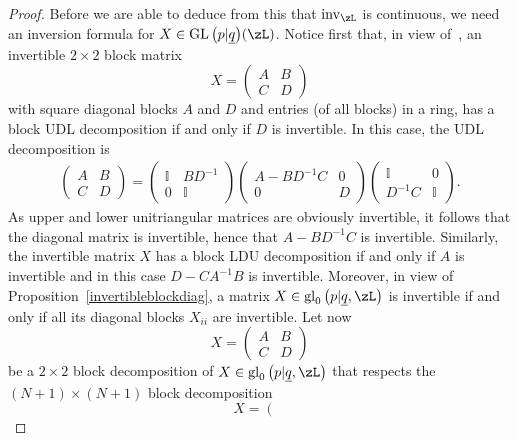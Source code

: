 \documentclass[pdftex]{sigma}%
\newcommand{\op}[1]{\operatorname{#1}}
\def\ul{\underline}
\def\ul{\underline}
\newcommand{\0}{\otimes}
\numberwithin{equation}{section}
\begin{document}
\begin{proof}
Before we are able to deduce from this that $\op{inv}_\zL$ is continuous, we need an inversion formula for $X\in\op{GL}\big(p|\ul q\big)(\zL)$. Notice first that, in view of~\cite[Proposition 4.7]{Covolo:2012}, an invertible $2\times 2$ block matrix
\begin{equation*}
X =\begin{pmatrix}
 A & B\\
 C & D
\end{pmatrix}
\end{equation*}
with square diagonal blocks $A$ and $D$ and entries (of all blocks) in a ring, has a block UDL decomposition if and only if $D$ is invertible. In this case, the UDL decomposition is
\begin{gather*} %
\begin{pmatrix} A & B \\[2pt] C & D\end{pmatrix}
= \begin{pmatrix} \mathbb{I} & BD^{-1}\\[2pt] 0 & \mathbb{I}\end{pmatrix}
\begin{pmatrix} A-BD^{-1}C & 0 \\[2pt] 0 & D\end{pmatrix}
\begin{pmatrix} \mathbb{I} & 0 \\[2pt] D^{-1}C & \mathbb{I}\end{pmatrix}\!.
\end{gather*}
As upper and lower unitriangular matrices are obviously invertible, it follows that the diagonal matrix is invertible, hence that $A-BD^{-1}C$ is invertible. Similarly, the invertible matrix $X$ has a block LDU decomposition if and only if $A$ is invertible and in this case $D-CA^{-1}B$ is invertible. Moreover, in view of Proposition~\ref{invertibleblockdiag}, a matrix $X\in\op{gl}_0\big(p|\ul q,\zL\big)$ is invertible if and only if all its diagonal blocks $X_{ii}$ are invertible. Let now
\begin{equation*}
X =\begin{pmatrix}
 A & B\\
 C & D
\end{pmatrix}
\end{equation*}
be a $2\times 2$ block decomposition of $X\in\op{gl}_0\big(p|\ul q,\zL\big)$ that respects the $(N+1)\times (N+1)$ block decomposition
\begin{equation*}
X = \left(\begin{array}{c|c|c}

\end{array}
\end{equation*}
\end{proof}
\end{document}
